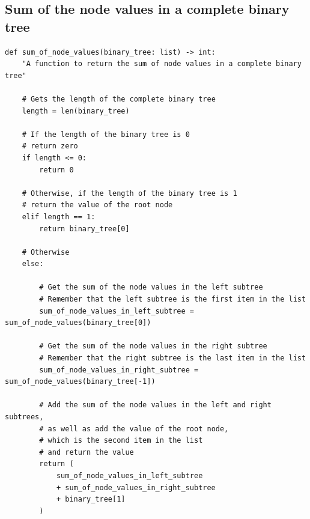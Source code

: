 \documentclass[11pt]{article}
\begin{document}
 \newpage

\subsection{Sum of the node values in a complete binary tree}
\label{sec:org7e890b0}
\begin{verbatim}
def sum_of_node_values(binary_tree: list) -> int:
    "A function to return the sum of node values in a complete binary tree"

    # Gets the length of the complete binary tree
    length = len(binary_tree)

    # If the length of the binary tree is 0
    # return zero
    if length <= 0:
        return 0

    # Otherwise, if the length of the binary tree is 1
    # return the value of the root node
    elif length == 1:
        return binary_tree[0]

    # Otherwise
    else:

        # Get the sum of the node values in the left subtree
        # Remember that the left subtree is the first item in the list
        sum_of_node_values_in_left_subtree = sum_of_node_values(binary_tree[0])

        # Get the sum of the node values in the right subtree
        # Remember that the right subtree is the last item in the list
        sum_of_node_values_in_right_subtree = sum_of_node_values(binary_tree[-1])

        # Add the sum of the node values in the left and right subtrees,
        # as well as add the value of the root node,
        # which is the second item in the list
        # and return the value
        return (
            sum_of_node_values_in_left_subtree
            + sum_of_node_values_in_right_subtree
            + binary_tree[1]
        )
\end{verbatim}

 \newpage
\end{document}
